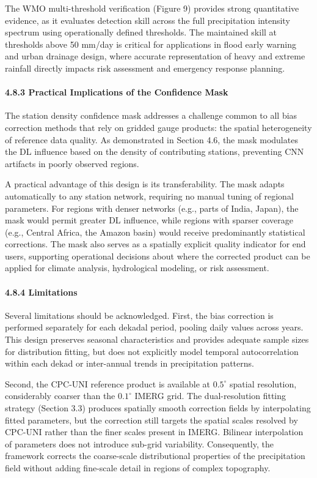 \documentclass[
]{article}
\begin{document}
The WMO multi-threshold verification (Figure 9) provides strong
quantitative evidence, as it evaluates detection skill across the full
precipitation intensity spectrum using operationally defined thresholds.
The maintained skill at thresholds above 50 mm/day is critical for
applications in flood early warning and urban drainage design, where
accurate representation of heavy and extreme rainfall directly impacts
risk assessment and emergency response planning.

\paragraph{4.8.3 Practical Implications of the Confidence
Mask}\label{practical-implications-of-the-confidence-mask}

The station density confidence mask addresses a challenge common to all
bias correction methods that rely on gridded gauge products: the spatial
heterogeneity of reference data quality. As demonstrated in Section 4.6,
the mask modulates the DL influence based on the density of contributing
stations, preventing CNN artifacts in poorly observed regions.

A practical advantage of this design is its transferability. The mask
adapts automatically to any station network, requiring no manual tuning
of regional parameters. For regions with denser networks (e.g., parts of
India, Japan), the mask would permit greater DL influence, while regions
with sparser coverage (e.g., Central Africa, the Amazon basin) would
receive predominantly statistical corrections. The mask also serves as a
spatially explicit quality indicator for end users, supporting
operational decisions about where the corrected product can be applied
for climate analysis, hydrological modeling, or risk assessment.

\paragraph{4.8.4 Limitations}\label{limitations}

Several limitations should be acknowledged. First, the bias correction
is performed separately for each dekadal period, pooling daily values
across years. This design preserves seasonal characteristics and
provides adequate sample sizes for distribution fitting, but does not
explicitly model temporal autocorrelation within each dekad or
inter-annual trends in precipitation patterns.

Second, the CPC-UNI reference product is available at \(0.5^{\circ}\)
spatial resolution, considerably coarser than the \(0.1^{\circ}\) IMERG
grid. The dual-resolution fitting strategy (Section 3.3) produces
spatially smooth correction fields by interpolating fitted parameters,
but the correction still targets the spatial scales resolved by CPC-UNI
rather than the finer scales present in IMERG. Bilinear interpolation of
parameters does not introduce sub-grid variability. Consequently, the
framework corrects the coarse-scale distributional properties of the
precipitation field without adding fine-scale detail in regions of
complex topography.
\end{document}
